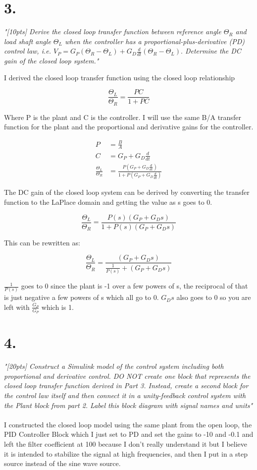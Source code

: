 \documentclass{article}
\begin{document}
\section*{3.}

\textit{
    "[10pts] Derive the closed loop transfer function between reference angle
    $\Theta_R$ and load shaft angle $\Theta_L$ when the controller has a 
    proportional-plus-derivative (PD) control law, i.e.
    $V_P = G_P(\Theta_R - \Theta_L) + G_D\frac{d}{dt}(\Theta_R - \Theta_L).$
    Determine the DC gain of the closed loop system."
}

I derived the closed loop transfer function using the closed loop relationship

\[
\frac{\Theta_L}{\Theta_R}=\frac{PC}{1+PC}
\]

Where P is the plant and C is the controller.
I will use the same B/A transfer function for the plant and the proportional and derivative gains for the controller.

\begin{align*}
    P &= \frac{B}{A} \\
    C &= G_P+G_D\frac{d}{dt} \\
    \frac{\Theta_L}{\Theta_R}&=\frac{P(G_P+G_D\frac{d}{dt})}{1+P(G_P+G_D\frac{d}{dt})}
\end{align*}

The DC gain of the closed loop system can be derived by converting the transfer function to the LaPlace domain and getting the value as s goes to 0.

\[
\frac{\Theta_L}{\Theta_R}=\frac{P(s)(G_P+G_Ds)}{1+P(s)(G_P+G_Ds)}
\]

This can be rewritten as:

\[
\frac{\Theta_L}{\Theta_R}=\frac{(G_P+G_Ds)}{\frac{1}{P(s)}+(G_P+G_Ds)}
\]

$\frac{1}{P(s)}$ goes to 0 since the plant is -1 over a few powers of s, the reciprocal of that is just negative a few powers of s which all go to 0.
$G_Ds$ also goes to 0 so you are left with $\frac{G_P}{G_P}$ which is 1.

\section*{4.}

\textit{
    "[20pts] Construct a Simulink model of the control system including both proportional and
    derivative control. DO NOT create one block that represents the closed loop transfer function
    derived in Part 3. Instead, create a second block for the control law itself and then connect it in a
    unity-feedback control system with the Plant block from part 2. Label this block diagram with
    signal names and units"
}
\\
\\
I constructed the closed loop model using the same plant from the open loop, the PID Controller Block which I just set to PD and set the gains to -10 and -0.1 and left the filter coefficient at 100 because I don't really understand it but I believe it is intended to stabilize the signal at high frequencies, and then I put in a step source instead of the sine wave source.
\end{document}
